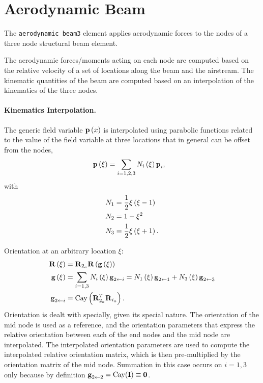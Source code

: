 \section{Aerodynamic Beam}
The \texttt{aerodynamic beam3} element applies aerodynamic forces
to the nodes of a three node structural beam element. 

The aerodynamic forces/moments acting on each node 
are computed based on the relative velocity of a set of locations
along the beam and the airstream.
The kinematic quantities of the beam are computed based
on an interpolation of the kinematics of the three nodes.

\paragraph{Kinematics Interpolation.}
The generic field variable $\bm{\mathbf{p}}\left( x \right)$ is interpolated
using parabolic functions related to the value of the field 
variable at three locations that in general can be offset
from the nodes,
\begin{align}
	\bm{\mathbf{p}}\left( \xi \right)
	&=
	\sum_{i=1,2,3} N_i\left( \xi \right) \bm{\mathbf{p}}_i
	,
\end{align}
with
\begin{subequations}
\begin{align}
	N_1 &= \frac{1}{2} \xi \left( \xi - 1 \right)
	\\
	N_2 &= 1 - \xi^2
	\\
	N_3 &= \frac{1}{2} \xi \left( \xi + 1 \right)
	.
\end{align}
\end{subequations}

Orientation at an arbitrary location $\xi$:
\begin{align}
	\bm{\mathbf{R}}\left( \xi \right)
	&=
	\bm{\mathbf{R}}_{2_a} \bm{\mathbf{R}}\left( \bm{\mathbf{g}}\left( \xi \right) \right)
	\\
	\bm{\mathbf{g}}\left( \xi \right)
	&=
	\sum_{i=1,3} N_i\left( \xi \right) \bm{\mathbf{g}}_{2\leftarrow i}
	= N_1\left( \xi \right) \bm{\mathbf{g}}_{2\leftarrow 1} + N_3\left( \xi \right) \bm{\mathbf{g}}_{2\leftarrow 3}
	\\
	\bm{\mathbf{g}}_{2\leftarrow i}
	&=
	\text{Cay}\left( \bm{\mathbf{R}}_{2_a}^T \bm{\mathbf{R}}_{i_a} \right)
	.
\end{align}
Orientation is dealt with specially, given its special nature.
The orientation of the mid node is used as a reference,
and the orientation parameters that express the relative orientation
between each of the end nodes and the mid node are interpolated.
The interpolated orientation parameters are used to compute
the interpolated relative orientation matrix, which is then
pre-multiplied by the orientation matrix of the mid node.
Summation in this case occurs on $i=1,3$ only because by definition
$\bm{\mathbf{g}}_{2\leftarrow 2}=\text{Cay}(\bm{\mathbf{I}})\equiv\bm{\mathbf{0}}$.

